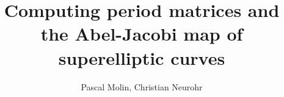 \documentclass[10pt,a4paper]{article}
\title{Computing period matrices and the Abel-Jacobi map of superelliptic curves}
\author{Pascal Molin, Christian Neurohr}
\def\biblio{}
\begin{document}
\def\biblio{}

\maketitle






















\newpage


\end{document}
